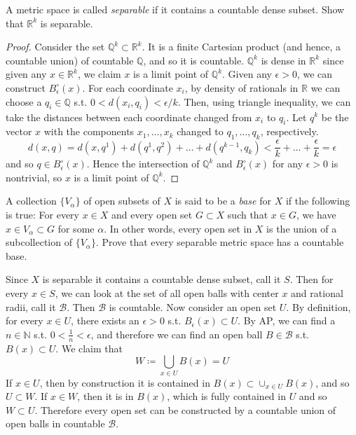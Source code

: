     \begin{exercise}[Rudin 2.22]
    A metric space is called \textit{separable} if it contains a countable dense subset. Show that $\mathbb{R}^k$ is separable. 
    \end{exercise}
    \begin{proof}
    Consider the set $\mathbb{Q}^k \subset \mathbb{R}^k$. It is a finite Cartesian product (and hence, a countable union) of countable $\mathbb{Q}$, and so it is countable. $\mathbb{Q}^k$ is dense in $\mathbb{R}^k$ since given any $x \in \mathbb{R}^k$, we claim $x$ is a limit point of $\mathbb{Q}^k$. Given any $\epsilon > 0$, we can construct $B_\epsilon^\circ (x)$. For each coordinate $x_i$, by density of rationals in $\mathbb{R}$ we can choose a $q_i \in \mathbb{Q}$ s.t. $0 < d(x_i, q_i) < \epsilon / k$. Then, using triangle inequality, we can take the distances between each coordinate changed from $x_i$ to $q_i$. Let $q^k$ be the vector $x$ with the components $x_1, \ldots, x_k$ changed to $q_1, \ldots, q_k$, respectively. 
    \[d(x, q) = d(x, q^1) + d(q^1, q^2) + \ldots + d(q^{k-1}, q_k) < \frac{\epsilon}{k} + \ldots + \frac{\epsilon}{k} = \epsilon\]
    and so $q \in B_\epsilon^\circ (x)$. Hence the intersection of $\mathbb{Q}^k$ and $B_\epsilon^\circ (x)$ for any $\epsilon > 0$ is nontrivial, so $x$ is a limit point of $\mathbb{Q}^k$. 
    \end{proof}

    \begin{exercise}[Rudin 2.23]
    A collection $\{V_\alpha\}$ of open subsets of $X$ is said to be a \textit{base} for $X$ if the following is true: For every $x \in X$ and every open set $G \subset X$ such that $x \in G$, we have $x \in V_\alpha \subset G$ for some $\alpha$. In other words, every open set in $X$ is the union of a subcollection of $\{V_\alpha\}$. Prove that every separable metric space has a countable base. 
    \end{exercise}
    \begin{solution}
    Since $X$ is separable it contains a countable dense subset, call it $S$. Then for every $x \in S$, we can look at the set of all open balls with center $x$ and rational radii, call it $\mathcal{B}$. Then $\mathcal{B}$ is countable. Now consider an open set $U$. By definition, for every $x \in U$, there exists an $\epsilon > 0$ s.t. $B_\epsilon (x) \subset U$. By AP, we can find a $n \in \mathbb{N}$ s.t. $0 < \frac{1}{n} < \epsilon$, and therefore we can find an open ball $B \in \mathcal{B}$ s.t. $B (x) \subset U$. We claim that 
    \[W \coloneqq \bigcup_{x \in U} B (x) = U\]
    If $x \in U$, then by construction it is contained in $B(x) \subset \cup_{x \in U } B(x)$, and so $U \subset W$. If $x \in W$, then it is in $B(x)$, which is fully contained in $U$ and so $W \subset U$. Therefore every open set can be constructed by a countable union of open balls in countable $\mathcal{B}$. 
    \end{solution} 

